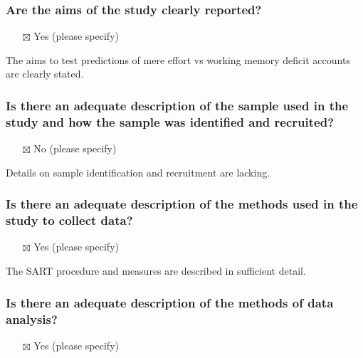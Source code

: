 \documentclass[
  doc, a4paper]{apa7}
\providecommand{\tightlist}{%
  \setlength{\itemsep}{0pt}\setlength{\parskip}{0pt}}
\begin{document}
\subsubsection{Are the aims of the study clearly reported?}\label{are-the-aims-of-the-study-clearly-reported}

\begin{itemize}
\tightlist
\item[$\boxtimes$]
  Yes (please specify)
\end{itemize}

The aims to test predictions of mere effort vs working memory deficit accounts are clearly stated.

\subsubsection{Is there an adequate description of the sample used in the study and how the sample was identified and recruited?}\label{is-there-an-adequate-description-of-the-sample-used-in-the-study-and-how-the-sample-was-identified-and-recruited}

\begin{itemize}
\tightlist
\item[$\boxtimes$]
  No (please specify)
\end{itemize}

Details on sample identification and recruitment are lacking.

\subsubsection{Is there an adequate description of the methods used in the study to collect data?}\label{is-there-an-adequate-description-of-the-methods-used-in-the-study-to-collect-data}

\begin{itemize}
\tightlist
\item[$\boxtimes$]
  Yes (please specify)
\end{itemize}

The SART procedure and measures are described in sufficient detail.

\subsubsection{Is there an adequate description of the methods of data analysis?}\label{is-there-an-adequate-description-of-the-methods-of-data-analysis}

\begin{itemize}
\tightlist
\item[$\boxtimes$]
  Yes (please specify)
\end{itemize}
\end{document}
